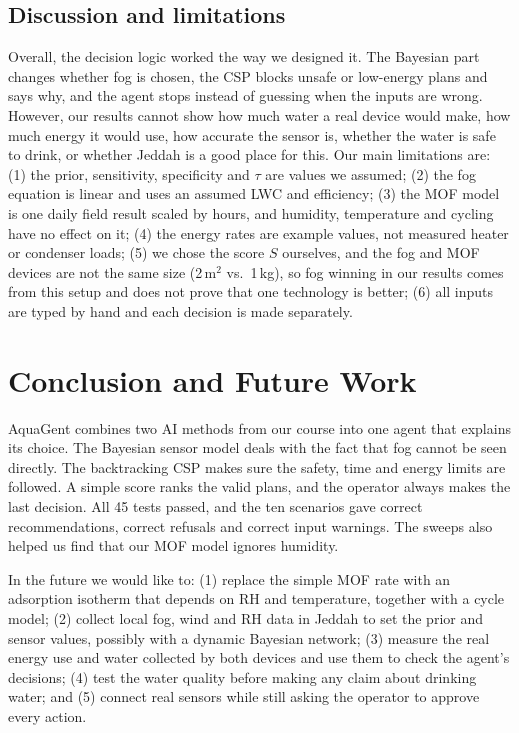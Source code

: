 \documentclass[11pt]{article}
\begin{document}
\subsection{Discussion and limitations}
Overall, the decision logic worked the way we designed it. The Bayesian part changes whether fog is chosen, the CSP blocks unsafe or low-energy plans and says why, and the agent stops instead of guessing when the inputs are wrong. However, our results cannot show how much water a real device would make, how much energy it would use, how accurate the sensor is, whether the water is safe to drink, or whether Jeddah is a good place for this. Our main limitations are:
(1) the prior, sensitivity, specificity and $\tau$ are values we assumed;
(2) the fog equation is linear and uses an assumed LWC and efficiency;
(3) the MOF model is one daily field result scaled by hours, and humidity, temperature and cycling have no effect on it;
(4) the energy rates are example values, not measured heater or condenser loads;
(5) we chose the score $S$ ourselves, and the fog and MOF devices are not the same size (2\,m$^2$ vs.\ 1\,kg), so fog winning in our results comes from this setup and does not prove that one technology is better;
(6) all inputs are typed by hand and each decision is made separately.

\section{Conclusion and Future Work}

AquaGent combines two AI methods from our course into one agent that explains its choice. The Bayesian sensor model deals with the fact that fog cannot be seen directly. The backtracking CSP makes sure the safety, time and energy limits are followed. A simple score ranks the valid plans, and the operator always makes the last decision. All 45 tests passed, and the ten scenarios gave correct recommendations, correct refusals and correct input warnings. The sweeps also helped us find that our MOF model ignores humidity.

In the future we would like to: (1) replace the simple MOF rate with an adsorption isotherm that depends on RH and temperature, together with a cycle model; (2) collect local fog, wind and RH data in Jeddah to set the prior and sensor values, possibly with a dynamic Bayesian network; (3) measure the real energy use and water collected by both devices and use them to check the agent's decisions; (4) test the water quality before making any claim about drinking water; and (5) connect real sensors while still asking the operator to approve every action.
\end{document}
